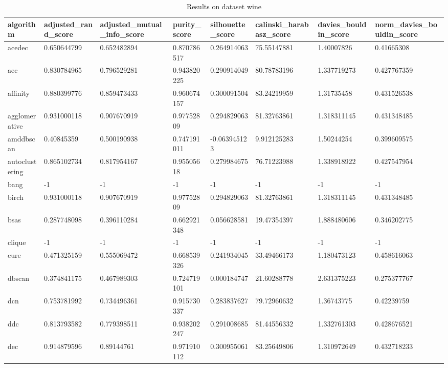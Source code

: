 \begin{table}[H]
\centering
\caption{Results on dataset wine}
\label{tab:params:wine}
\begin{tabular}{|l|l|l|l|l|l|l|l|}
\hline
algorithm & adjusted\_rand\_score & adjusted\_mutual\_info\_score & purity\_score & silhouette\_score & calinski\_harabasz\_score & davies\_bouldin\_score & norm\_davies\_bouldin\_score \\
\hline
acedec & 0.650644799 & 0.652482894 & 0.870786517 & 0.264914063 & 75.55147881 & 1.40007826 & 0.41665308 \\
\hline
aec & 0.830784965 & 0.796529281 & 0.943820225 & 0.290914049 & 80.78783196 & 1.337719273 & 0.427767359 \\
\hline
affinity & 0.880399776 & 0.859473433 & 0.960674157 & 0.300091504 & 83.24219959 & 1.31735458 & 0.431526538 \\
\hline
agglomerative & 0.931000118 & 0.907670919 & 0.97752809 & 0.294829063 & 81.32763861 & 1.318311145 & 0.431348485 \\
\hline
amddbscan & 0.40845359 & 0.500190938 & 0.747191011 & -0.063945123 & 9.912125283 & 1.50244254 & 0.399609575 \\
\hline
autoclustering & 0.865102734 & 0.817954167 & 0.95505618 & 0.279984675 & 76.71223988 & 1.338918922 & 0.427547954 \\
\hline
bang & -1 & -1 & -1 & -1 & -1 & -1 & -1 \\
\hline
birch & 0.931000118 & 0.907670919 & 0.97752809 & 0.294829063 & 81.32763861 & 1.318311145 & 0.431348485 \\
\hline
bsas & 0.287748098 & 0.396110284 & 0.662921348 & 0.056628581 & 19.47354397 & 1.888480606 & 0.346202775 \\
\hline
clique & -1 & -1 & -1 & -1 & -1 & -1 & -1 \\
\hline
cure & 0.471325159 & 0.555069472 & 0.668539326 & 0.241934045 & 33.49466173 & 1.180473123 & 0.458616063 \\
\hline
dbscan & 0.374841175 & 0.467989303 & 0.724719101 & 0.000184747 & 21.60288778 & 2.631375223 & 0.275377767 \\
\hline
dcn & 0.753781992 & 0.734496361 & 0.915730337 & 0.283837627 & 79.72960632 & 1.36743775 & 0.42239759 \\
\hline
ddc & 0.813793582 & 0.779398511 & 0.938202247 & 0.291008685 & 81.44556332 & 1.332761303 & 0.428676521 \\
\hline
dec & 0.914879596 & 0.89144761 & 0.971910112 & 0.300955061 & 83.25649806 & 1.310972649 & 0.432718233 \\

\end{tabular}
\end{table}
